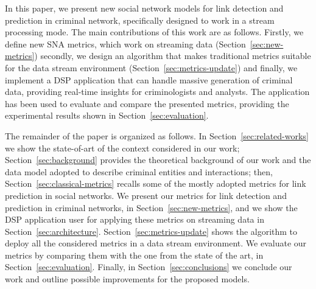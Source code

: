 %
%
In this paper, we present new social network models for link detection and prediction in criminal network, specifically designed to work in a stream processing mode.
%
The main contributions of this work are as follows. 
%
Firstly, we define new SNA metrics, which work on streaming data (Section~\ref{sec:new-metrics}) secondly, we design an algorithm that makes traditional metrics suitable for the data stream environment (Section~\ref{sec:metrics-update}) and finally, we implement a DSP application that can handle massive generation of criminal data, providing real-time insights for criminologists and analysts. The application has been used to evaluate and compare the presented metrics, providing the experimental results shown in Section~\ref{sec:evaluation}.

%
%
The remainder of the paper is organized as follows.
%
In Section~\ref{sec:related-works} we show the state-of-art of the context considered in our work; Section~\ref{sec:background} provides the theoretical background of our work and the data model adopted to describe criminal entities and interactions; then, Section~\ref{sec:classical-metrics} recalls 
some of the mostly adopted metrics for link prediction in social networks.
%
We present our metrics for link detection and prediction in criminal networks, in Section~\ref{sec:new-metrics}, and we show the DSP application user for applying these metrics on streaming data in Section~\ref{sec:architecture}.
%
Section~\ref{sec:metrics-update} shows the algorithm to deploy all the considered metrics in a data stream environment. %
%
We evaluate our metrics by comparing them with the one from the state of the art, 
in Section~\ref{sec:evaluation}.
%
Finally, in Section~\ref{sec:conclusions} we conclude our work and outline possible improvements for the proposed models.







